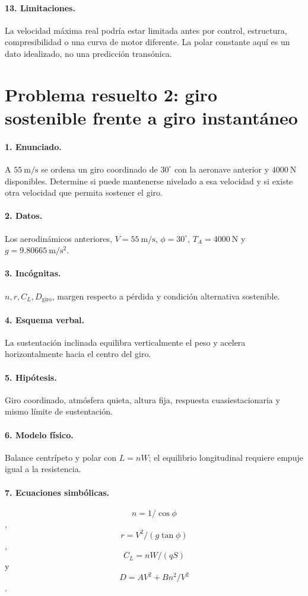 \paragraph{13. Limitaciones.} La velocidad máxima real podría estar limitada antes por control, estructura, compresibilidad o una curva de motor diferente. La polar constante aquí es un dato idealizado, no una predicción transónica.

\section{Problema resuelto 2: giro sostenible frente a giro instantáneo}
\paragraph{1. Enunciado.} A $55\ \mathrm{m/s}$ se ordena un giro coordinado de $30^\circ$ con la aeronave anterior y $4000\ \mathrm N$ disponibles. Determine si puede mantenerse nivelado a esa velocidad y si existe otra velocidad que permita sostener el giro.
\paragraph{2. Datos.} Los aerodinámicos anteriores, $V=55\ \mathrm{m/s}$, $\phi=30^\circ$, $T_A=4000\ \mathrm N$ y $g=9.80665\ \mathrm{m/s^2}$.
\paragraph{3. Incógnitas.} $n,r,C_L,D_{\mathrm{giro}}$, margen respecto a pérdida y condición alternativa sostenible.
\paragraph{4. Esquema verbal.} La sustentación inclinada equilibra verticalmente el peso y acelera horizontalmente hacia el centro del giro.
\paragraph{5. Hipótesis.} Giro coordinado, atmósfera quieta, altura fija, respuesta cuasiestacionaria y mismo límite de sustentación.
\paragraph{6. Modelo físico.} Balance centrípeto y polar con $L=nW$; el equilibrio longitudinal requiere empuje igual a la resistencia.
\paragraph{7. Ecuaciones simbólicas.} \[n=1/\cos\phi\], \[r=V^2/(g\tan\phi)\], \[C_L=nW/(qS)\] y \[D=AV^2+Bn^2/V^2\].
